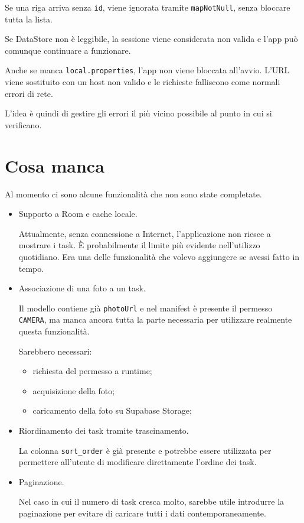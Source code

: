 \documentclass[11pt,a4paper]{article}
\begin{document}
Se una riga arriva senza \texttt{id}, viene ignorata tramite
\texttt{mapNotNull}, senza bloccare tutta la lista.

Se DataStore non è leggibile, la sessione viene considerata non valida e
l'app può comunque continuare a funzionare.

Anche se manca \texttt{local.properties}, l'app non viene bloccata all'avvio.
L'URL viene sostituito con un host non valido e le richieste falliscono come
normali errori di rete.

L'idea è quindi di gestire gli errori il più vicino possibile al punto in cui
si verificano.


\section{Cosa manca}

Al momento ci sono alcune funzionalità che non sono state completate.

\begin{itemize}

  \item
  Supporto a Room e cache locale.

  Attualmente, senza connessione a Internet, l'applicazione non riesce a
  mostrare i task. È probabilmente il limite più evidente nell'utilizzo
  quotidiano. Era una delle funzionalità che volevo aggiungere se avessi fatto
  in tempo.

  \item
  Associazione di una foto a un task.

  Il modello contiene già \texttt{photoUrl} e nel manifest è presente il
  permesso \texttt{CAMERA}, ma manca ancora tutta la parte necessaria per
  utilizzare realmente questa funzionalità.

  Sarebbero necessari:
  \begin{itemize}
    \item richiesta del permesso a runtime;
    \item acquisizione della foto;
    \item caricamento della foto su Supabase Storage;
  \end{itemize}

  \item
  Riordinamento dei task tramite trascinamento.

  La colonna \texttt{sort\_order} è già presente e potrebbe essere utilizzata
  per permettere all'utente di modificare direttamente l'ordine dei task.

  \item
  Paginazione.

  Nel caso in cui il numero di task cresca molto, sarebbe utile introdurre la
  paginazione per evitare di caricare tutti i dati contemporaneamente.

\end{itemize}
\end{document}
